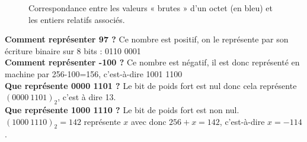 \begin{figure}[H]
\begin{center}
    \end{center}
    \caption*{Correspondance entre les valeurs « brutes »  d'un octet (en bleu) et les entiers relatifs associés.}
\end{figure}
\begin{exemple}[s]
    \textbf{Comment représenter 97 ?} Ce nombre est positif, on le représente par son écriture binaire sur 8 bits : 0110
    0001\\

    \textbf{Comment représenter -100 ?} Ce nombre est négatif, il est donc représenté en machine par 256-100=156,
    c'est-à-dire 1001 1100\\

    \textbf{Que représente 0000 1101 ?} Le bit de poids fort est nul donc cela représente $(0000\ 1101)_2$, c'est à dire
    13.\\

    \textbf{Que représente 1000 1110 ?} Le bit de poids fort est non nul. $(1000\ 1110)_2=142$ représente $x$ avec donc
    $256+x=142$, c'est-à-dire $x=-114$.
\end{exemple}

